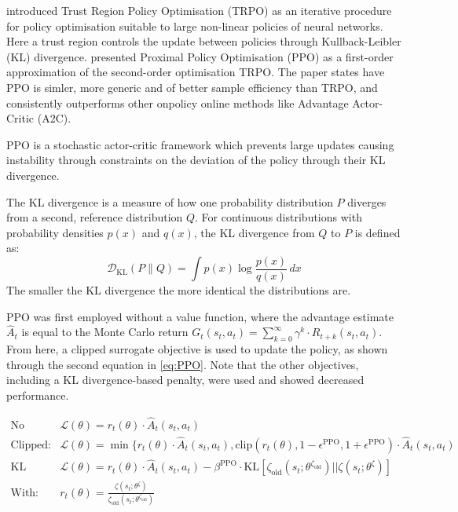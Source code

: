 \cite{schulman2015trpo} introduced Trust Region Policy Optimisation (TRPO) as an iterative procedure for policy optimisation suitable to large non-linear policies of neural networks. Here a trust region controls the update between policies through Kullback-Leibler (KL) divergence. \cite{schulman2017proximal} presented Proximal Policy Optimisation (PPO) as a first-order approximation of the second-order optimisation TRPO. The paper states have PPO is simler, more generic and of better sample efficiency than TRPO, and consistently outperforms other onpolicy online methods like Advantage Actor-Critic (A2C).

PPO is a stochastic actor-critic framework which prevents large updates causing instability through constraints on the deviation of the policy through their KL divergence.

\begin{tcolorbox}[title={\textbf{Lemma. KL divergence}}]
The KL divergence is a measure of how one probability distribution \( P \) diverges from a second, reference distribution \( Q \). For continuous distributions with probability densities \( p(x) \) and \( q(x) \), the KL divergence from \( Q \) to \( P \) is defined as:
\[
\mathcal{D}_{\mathrm{KL}}(P \parallel Q) = \int p(x) \log \frac{p(x)}{q(x)} \, dx
\]
The smaller the KL divergence the more identical the distributions are.
\end{tcolorbox}

PPO was first employed without a value function, where the advantage estimate \(\hat{A}_t\) is equal to the Monte Carlo return \(G_t(s_t, a_t) = \sum_{k=0}^\infty \gamma^k \cdot R_{t+k}(s_t, a_t) \). From here, a clipped surrogate objective is used to update the policy, as shown through the second equation in \autoref{eq:PPO}. Note that the other objectives, including a KL divergence-based penalty, were used and showed decreased performance.

\begin{equation}
\begin{aligned}
    \text{No clipping or penalty:}& \mathcal{L}(\theta) = r_t(\theta) \cdot \hat{A}_t(s_t, a_t) \\
    \text{Clipped:}& \mathcal{L}(\theta) = \min\{r_t(\theta)\cdot\hat{A}_t(s_t, a_t), \text{clip}(r_t(\theta), 1 - \epsilon^{\text{PPO}}, 1 + \epsilon^{\text{PPO}}) \cdot \hat{A}_t(s_t, a_t) \\
    \text{KL penalty:}& \mathcal{L}(\theta) = r_t(\theta) \cdot \hat{A}_t(s_t, a_t) - \beta^{\text{PPO}} \cdot \text{KL}[\zeta_{\text{old}}(s_t; \theta^{\zeta_{\text{old}}}) || \zeta(s_t; \theta^\zeta)] \\
    \text{With:}& r_t(\theta) = \frac{\zeta(s_t; \theta^\zeta)}{\zeta_{\text{old}}(s_t; \theta^{\zeta_{\text{old}}})}
\end{aligned}
\label{eq:PPO}
\end{equation}

